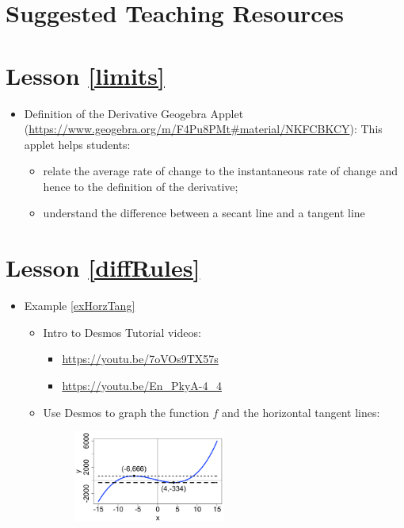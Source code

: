 \section*{Suggested Teaching Resources} 
\section*{Lesson \ref{limits}}
\begin{itemize}[leftmargin=*]
    \item Definition of the Derivative Geogebra Applet (\url{https://www.geogebra.org/m/F4Pu8PMt#material/NKFCBKCY}): This applet helps students:
    \begin{itemize}
        \item relate the average rate of change to the instantaneous rate of change and hence to the definition of the derivative;
        \item understand the difference between a secant line and a tangent line
    \end{itemize}
     
\end{itemize}

\section*{Lesson \ref{diffRules}}
\begin{itemize}[leftmargin=*]
    \item Example \ref{exHorzTang} 
    \begin{itemize}
        \item Intro to Desmos Tutorial videos:
        \begin{itemize}
            \item \url{https://youtu.be/7oVOs9TX57s}
            \item \url{https://youtu.be/En_PkyA-4_4} 
        \end{itemize}
        \item Use Desmos to graph the function $f$ and the horizontal tangent lines:
        \begin{figure}[h!]
        \includegraphics[width=0.5\textwidth,inner]{images/differentiationRules/Lesson4_HorizontalTangentEx.png}
        \end{figure}
    \end{itemize}
    
     
\end{itemize}

